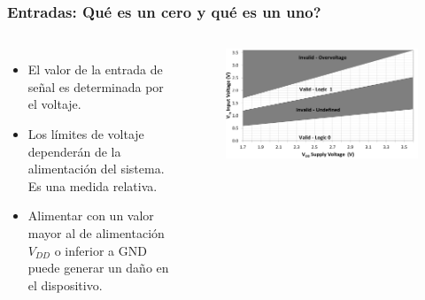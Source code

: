 \documentclass[10.5pt,scale=1.0,t,aspectratio=169,hyperref={pdfpagelabels=false}]{beamer}
\begin{document}
\begin{frame}
	\frametitle{Entradas: Qué es un cero y qué es un uno?}
	\begin{columns}
		\begin{itemize}
			\item El valor de la entrada de señal es determinada por el voltaje.
			\item Los límites de voltaje dependerán de la alimentación del sistema. Es una medida relativa.
			\item Alimentar con un valor mayor al de alimentación $V_{DD}$ o inferior a GND puede generar un daño en el dispositivo. 
		\end{itemize}
		\begin{figure}
			\centering
			\includegraphics[scale=0.35]{02_ThresholdVoltage}
		\end{figure}
	\end{columns}
\end{frame}
\end{document}
